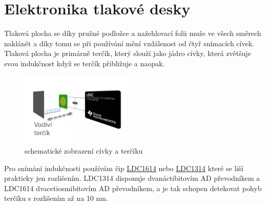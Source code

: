 \section*{Elektronika tlakové desky}

Tlaková plocha se díky pružné podložce a nažehlovací folii muže ve všech směrech naklánět a díky tomu se při používání mění vzdálenost od čtyř snímacích
cívek. Tlaková plocha je primárně terčík, který slouží jako jádro cívky, která zvětšuje svou indukčnost když se terčík přibližuje a naopak.

\begin{figure}[htbp]
    \centering
    \includegraphics[width=200]{kapitoly/obrazky/E4/elektronika_tlakove_desky/civka_tercik_LDC.png}
    \caption{schematické zobrazení cívky a terčíku}
    \label{fig:E4-sch_civka_tercik}
\end{figure}

Pro snímání indukčnosti používám čip \href{https://www.ti.com/lit/ds/symlink/ldc1612.pdf?ts=1612018658531&ref_url=https%253A%252F%252Fwww.google.com%252F}{LDC1614}
nebo \href{https://www.ti.com/lit/ds/symlink/ldc1312.pdf?ts=1612017390818&ref_url=https%253A%252F%252Fwww.google.com%252F}{LDC1314} 
které se liší prakticky jen rozlišením. LDC1314 disponuje dvanáctibitovím AD převodníkem a LDC1614 dvacetiosmibitovím AD převodníkem, 
a je tak schopen detekovat pohyb terčíku s rozlišením až na 10 nm.

